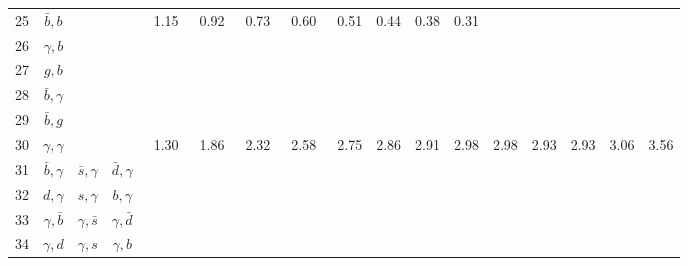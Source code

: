 \begin{tabular}{rccc@{}S@{}S@{}S@{}S@{}S@{}S@{}S@{}S@{}S@{}S@{}S@{}S@{}S}
  25 & $\bar b,b$       &                  &                 &\ 1.15 &\ 0.92 &\ 0.73 &\ 0.60 &\ 0.51 & 0.44 & 0.38 & 0.31 &      &      &      &      &      \\
  26 & $\gamma, b$      &                  &                 &       &       &       &       &       &      &      &      &      &      &      &      &      \\
  27 & $g,b$            &                  &                 &       &       &       &       &       &      &      &      &      &      &      &      &      \\
  28 & $\bar b,\gamma$  &                  &                 &       &       &       &       &       &      &      &      &      &      &      &      &      \\
  29 & $\bar b,g$       &                  &                 &       &       &       &       &       &      &      &      &      &      &      &      &      \\
  30 & $\gamma,\gamma$  &                  &                 &\ 1.30 &\ 1.86 &\ 2.32 &\ 2.58 &\ 2.75 & 2.86 & 2.91 & 2.98 & 2.98 & 2.93 & 2.93 & 3.06 & 3.56 \\
  31 & $\bar b,\gamma$  & $\bar s,\gamma$  & $\bar d,\gamma$ &       &       &       &       &       &      &      &      &      &      &      &      &      \\
  32 & $d,\gamma$       & $s,\gamma$       & $b,\gamma$      &       &       &       &       &       &      &      &      &      &      &      &      &      \\
  33 & $\gamma,\bar b$  & $\gamma,\bar s$  & $\gamma,\bar d$ &       &       &       &       &       &      &      &      &      &      &      &      &      \\
  34 & $\gamma,d$       & $\gamma,s$       & $\gamma, b$     &       &       &       &       &       &      &      &      &      &      &      &      &      \\
  \bottomrule
\end{tabular}
